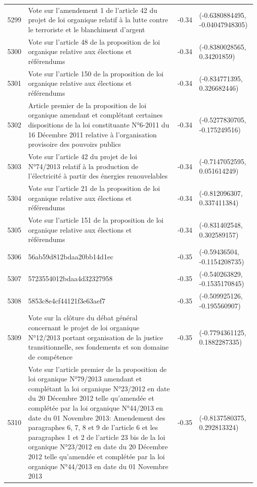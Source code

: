 \begin{table}[ht]
\begin{tabular}{rlrl}
  5299 & Vote sur l'amendement 1 de l'article 42 du projet de loi organique relatif à la lutte contre le terroriste et le blanchiment d'argent & -0.34 & (-0.6380884495, -0.04047948305) \\ 
  5300 & Vote sur l'article 48 de la proposition de loi organique relative aux élections et référendums & -0.34 & (-0.8380028565, 0.34201859) \\ 
  5301 & Vote sur l'article 150 de la proposition de loi organique relative aux élections et référendums & -0.34 & (-0.834771395, 0.326682446) \\ 
  5302 & Article premier de la proposition de loi organique amendant et complétant certaines dispositions de la loi constituante N°6-2011 du 16 Décembre 2011 relative à l'organisation provisoire des pouvoirs publics & -0.34 & (-0.5277830705, -0.175249516) \\ 
  5303 & Vote sur l'article 42 du projet de loi N°74/2013 relatif à la production de l'électricité à partir des énergies renouvelables & -0.34 & (-0.7147052595, 0.051614249) \\ 
  5304 & Vote sur l'article 21 de la proposition de loi organique relative aux élections et référendums & -0.34 & (-0.812096307, 0.337411384) \\ 
  5305 & Vote sur l'article 151 de la proposition de loi organique relative aux élections et référendums & -0.34 & (-0.831402548, 0.302589157) \\ 
  5306 & 56ab59d812bdaa20bb14d1ec & -0.35 & (-0.59436504, -0.1154208735) \\ 
  5307 & 5723554012bdaa4d32327958 & -0.35 & (-0.540263829, -0.1535170845) \\ 
  5308 & 5853c8e4cf44121f3e63aef7 & -0.35 & (-0.509925126, -0.195560907) \\ 
  5309 & Vote sur la clôture du débat général concernant le projet de loi organique N°12/2013 portant organisation de la justice transitionnelle, ses fondements et son domaine de compétence & -0.35 & (-0.7794361125, 0.1882287335) \\ 
  5310 & Vote sur l'article premier de la proposition de loi organique N°79/2013 amendant et complétant la loi organique N°23/2012 en date du 20 Décembre 2012 telle qu'amendée et complétée par la loi organique N°44/2013 en date du 01 Novembre 2013: Amendement des paragraphes 6, 7, 8 et 9 de l'article 6 et les paragraphes 1 et 2 de l'article 23 bis de la loi organique N°23/2012 en date du 20 Décembre 2012 telle qu'amendée et complétée par la loi organique N°44/2013 en date du 01 Novembre 2013 & -0.35 & (-0.8137580375, 0.292813324) \\ 

\end{tabular}
\end{table}
